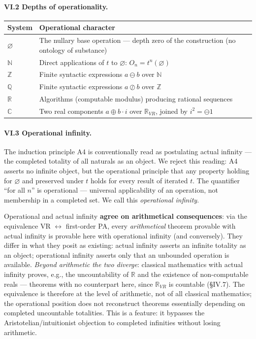 \documentclass[11pt]{article}
\theoremstyle{definition}
\newcommand{\zero}{\varnothing}
\newcommand{\Obj}{O}
\newcommand{\Z}{\mathbb{Z}}
\newcommand{\Q}{\mathbb{Q}}
\newcommand{\R}{\mathbb{R}}
\newcommand{\C}{\mathbb{C}}
\newcommand{\N}{\mathbb{N}}
\newcommand{\isub}{\ominus}              %
\newcommand{\fdiv}{\oslash}              %
\begin{document}
\paragraph{VI.2 Depths of operationality.}
\begin{center}
\begin{tabular}{ll}
\textbf{System} & \textbf{Operational character}\\ \hline
$\zero$ & The nullary base operation --- depth zero of the construction (no ontology of substance)\\
$\N$ & Direct applications of $t$ to $\zero$: $\Obj_n=t^n(\zero)$\\
$\Z$ & Finite syntactic expressions $a\isub b$ over $\N$\\
$\Q$ & Finite syntactic expressions $a\fdiv b$ over $\Z$\\
$\R$ & Algorithms (computable modulus) producing rational sequences\\
$\C$ & Two real components $a\oplus b\cdot i$ over $\R_{VR}$, joined by $i^2=\isub 1$\\
\end{tabular}
\end{center}

\paragraph{VI.3 Operational infinity.} The induction principle A4 is conventionally read as
postulating actual infinity --- the completed totality of all naturals as an object. We reject this
reading: A4 asserts no infinite object, but the operational principle that any property holding for
$\zero$ and preserved under $t$ holds for every result of iterated $t$. The quantifier ``for all $n$'' is
operational --- universal applicability of an operation, not membership in a completed set. We call
this \emph{operational infinity}.

Operational and actual infinity \textbf{agree on arithmetical consequences}: via the equivalence
VR $\leftrightarrow$ first-order PA, every \emph{arithmetical} theorem provable with actual infinity
is provable here with operational infinity (and conversely). They differ in what they posit as
existing: actual infinity asserts an infinite totality as an object; operational infinity asserts only that
an unbounded operation is available. \emph{Beyond arithmetic the two diverge}: classical mathematics
with actual infinity proves, e.g., the uncountability of $\R$ and the existence of non-computable reals
--- theorems with no counterpart here, since $\R_{VR}$ is countable (\S IV.7). The equivalence is
therefore at the level of arithmetic, not of all classical mathematics; the operational position does
not reconstruct theorems essentially depending on completed uncountable totalities. This is a feature:
it bypasses the Aristotelian/intuitionist objection to completed infinities without losing arithmetic.
\end{document}
